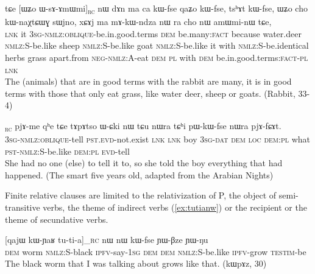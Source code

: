 \documentclass[oldfontcommands,oneside,a4paper,11pt]{article}
\newcommand{\ipa}[1]{{\phon#1}} %
\newcommand{\topic}{\textsc{dem}}
\newcommand{\rc}{\textsubscript{\textsc{rc}}}
\begin{document}
     \begin{exe}
   \ex \label{ex:WsAmWmi}
 \gll 
\ipa{tɕe}   	[\ipa{ɯʑo}   	\ipa{ɯ-sɤ-ɤmɯmi}]\rc{}   	\ipa{nɯ}   	\ipa{dɤn}   	\ipa{ma}   	\ipa{ca}   	\ipa{kɯ-fse}   	\ipa{qaʑo}   	\ipa{kɯ-fse,}   	\ipa{tsʰɤt}   	\ipa{kɯ-fse,}   	 \ipa{ɯʑo}   	\ipa{cho}   	\ipa{kɯ-naχtɕɯɣ}   	\ipa{sɯjno,}   	\ipa{xɕɤj}   	\ipa{ma}   	\ipa{mɤ-kɯ-ndza}   	\ipa{nɯ} \ipa{ra}   	\ipa{cho}   	\ipa{nɯ}   	\ipa{amɯmi-nɯ}   	\ipa{tɕe,}   \\
\textsc{lnk} it \textsc{3sg-nmlz:oblique}-be.in.good.terms \topic{}  be.many:\textsc{fact} because water.deer \textsc{nmlz:S}-be.like sheep \textsc{nmlz:S}-be.like goat  \textsc{nmlz:S}-be.like it with  \textsc{nmlz:S}-be.identical herbs grass apart.from \textsc{neg-nmlz:A}-eat \textsc{dem} \textsc{pl} with \textsc{dem}  be.in.good.terms:\textsc{fact}-\textsc{pl} \textsc{lnk} \\
\glt The (animals) that are in good terms with the rabbit are many, it is in good terms with those that only eat grass, like water deer, sheep or goats. (Rabbit, 33-4)
\end{exe}

\begin{exe}
\ex \label{ex:WsAfCAt}
\gll
[\ipa{ɯ-sɤ-fɕɤt}]\rc{} 
\ipa{pjɤ-me} 	\ipa{qʰe} 	\ipa{tɕe} 	\ipa{tɤpɤtso} 	\ipa{ɯ-ɕki} 	\ipa{nɯ} 	\ipa{tɕu} 	\ipa{nɯra} 	\ipa{tɕʰi} 	\ipa{pɯ-kɯ-fse} 	\ipa{nɯra} 	\ipa{pjɤ-fɕɤt.} \\
\textsc{3sg-nmlz:oblique}-tell \textsc{pst.evd}-not.exist \textsc{lnk} \textsc{lnk} boy \textsc{3sg-dat} \textsc{dem} \textsc{loc} \textsc{dem:pl} what \textsc{pst-nmlz:S}-be.like  \textsc{dem:pl} \textsc{evd}-tell \\
\glt She had no one (else) to tell it to, so she told the boy everything that had happened. (The smart five years old, adapted from the Arabian Nights)
\end{exe} 

Finite relative clauses are limited to the relativization of P, the object of semi-transitive verbs, the theme of indirect verbs (\ref{ex:tutianw}) or the recipient or the theme of secundative verbs.

     \begin{exe}
   \ex \label{ex:tutianw}
 \gll \ipa{nɯ}  	[\ipa{qajɯ}  	\ipa{kɯ-ɲaʁ}  	\ipa{tu-ti-a}]_{\textsc{rc}}  	\ipa{nɯ}  	\ipa{nɯ}  	\ipa{kɯ-fse}  	\ipa{ɲɯ-βze}  	\ipa{ɲɯ-ŋu}  \\
\textsc{dem} worm \textsc{nmlz:S}-black \textsc{ipfv}-say-\textsc{1sg} \textsc{dem}  \textsc{dem} \textsc{nmlz:S}-be.like \textsc{ipfv}-grow \textsc{testim}-be \\
\glt The black worm that I was talking about grows like that. (\ipa{kɯpɤz}, 30)
\end{exe}
\end{document}
